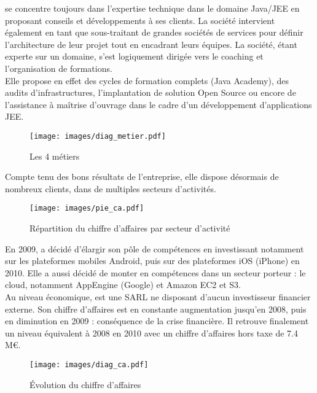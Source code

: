 \ebi{} se concentre toujours dans l'expertise technique dans le domaine Java/JEE en proposant conseils et développements à ses clients.
La société intervient également en tant que sous-traitant de grandes sociétés de services pour définir l'architecture de leur projet tout en encadrant leurs équipes.
La société, étant experte sur un domaine, s'est logiquement dirigée vers le coaching et l'organisation de formations.\\

Elle propose en effet des cycles de formation complets (Java Academy), des audits d'infrastructures, l'implantation de solution Open Source ou encore de l'assistance à maîtrise d'ouvrage dans le cadre d'un développement d'applications JEE.\\

\begin{figure}[H]
	\centering
	\texttt{[image: images/diag\_metier.pdf]}
	\caption{Les 4 métiers}
\end{figure}


Compte tenu des bons résultats de l'entreprise, elle dispose désormais de nombreux clients, dans de multiples secteurs d'activités.\\

\begin{figure}[H]
	\centering
	\texttt{[image: images/pie\_ca.pdf]}
	\caption{Répartition du chiffre d'affaires par secteur d'activité}
\end{figure}

En 2009, \ebi{} a décidé d'élargir son pôle de compétences en investissant notamment sur les plateformes mobiles Android, puis sur des plateformes iOS (iPhone) en 2010. Elle a aussi décidé de monter en compétences dans un secteur porteur : le cloud, notamment AppEngine (Google) et Amazon EC2 et S3.\\

Au niveau économique, \ebi{}  est une SARL ne disposant d'aucun investisseur financier externe. Son chiffre d'affaires est en constante augmentation jusqu'en 2008, puis en diminution en 2009 : conséquence de la crise financière. Il retrouve finalement un niveau équivalent à 2008 en 2010 avec un chiffre d'affaires hors taxe de 7.4 M\euro{}.\\

\begin{figure}[H]
	\centering
	\texttt{[image: images/diag\_ca.pdf]}
	\caption{Évolution du chiffre d'affaires}
\end{figure}


